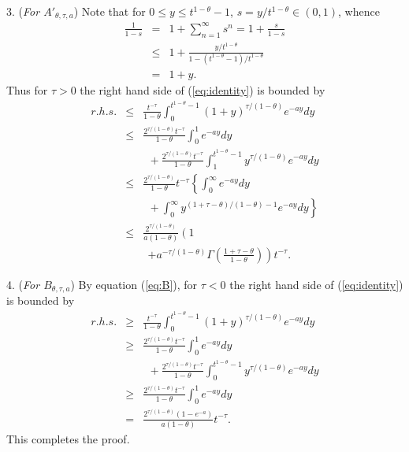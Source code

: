 \documentclass[twoside,twocolumn,journal]{IEEEtran}
\newenvironment{pf}[1][Proof]{\medskip\noindent\hspace{1em}{\itshape #1: }}{\hspace*{\fill}~\QED\par\endtrivlist\medskip}
\begin{document}
\begin{pf}
3. (\emph{For $A'_{\theta,\tau,a}$})
Note that for $0\leq y \leq t^{1-\theta}-1$, $s=y/t^{1-\theta}\in (0,1)$, whence
\begin{eqnarray} \label{eq:B}
\frac{1}{1-s} & = & 1 + \sum_{n=1}^\infty s^n
= 1 + \frac{s}{1 - s} \nonumber \\
& \leq & 1 + \frac{y/t^{1-\theta}}{1 - (t^{1-\theta}-1)/t^{1-\theta}} \nonumber \\
& = & 1 + y.
\end{eqnarray}
Thus for $\tau>0$ the right hand side of (\ref{eq:identity}) is bounded by
\begin{eqnarray*}
r.h.s.
& \leq &  \frac{t^{-\tau}}{1-\theta}\int_0^{t^{1-\theta}-1} (1+y)^{\tau/(1-\theta)} e^{-a y} d y  \\
& \leq & \frac{2^{\tau/(1-\theta)}t^{-\tau}}{1-\theta}\int_0^1  e^{-a y} d y  \\
& & \ \ + \frac{2^{\tau/(1-\theta)}t^{-\tau}}{1-\theta} \int_1^{t^{1-\theta}-1} y^{\tau/(1-\theta)} e^{-a y} d y \\
& \leq & \frac{2^{\tau/(1-\theta)}}{1-\theta} t^{-\tau}  \left\{\int_0^\infty  e^{-a y} d y \right. \\
& & \ \ + \left.\int_0^\infty y^{(1+\tau-\theta)/(1-\theta)-1} e^{-a y} d y \right\} \\
& \leq & \frac{2^{\tau/(1-\theta)}}{a(1-\theta)} \left(1 \right.\\
& & \ \ \left. +a^{-\tau/(1-\theta)} \Gamma \left( \frac{1+\tau-\theta}{1-\theta}\right)\right) t^{-\tau}.
\end{eqnarray*}

4. (\emph{For $B_{\theta,\tau,a}$})
By equation (\ref{eq:B}), for $\tau<0$ the right hand side of (\ref{eq:identity}) is bounded by
\begin{eqnarray*}
r.h.s.
& \geq &  \frac{t^{-\tau}}{1-\theta}\int_0^{t^{1-\theta}-1} (1+y)^{\tau/(1-\theta)} e^{-a y} d y  \\
& \geq & \frac{2^{\tau/(1-\theta)}t^{-\tau}}{1-\theta}\int_0^1  e^{-a y} d y  \\
& & \ \ + \frac{2^{\tau/(1-\theta)}t^{-\tau}}{1-\theta} \int_0^{t^{1-\theta}-1} y^{\tau/(1-\theta)} e^{-a y} d y \\
& \geq & \frac{2^{\tau/(1-\theta)}t^{-\tau}}{1-\theta}\int_0^1  e^{-a y} d y \\
& = & \frac{2^{\tau/(1-\theta)}(1-e^{-a})}{a(1-\theta)} t^{-\tau}.
\end{eqnarray*}
This completes the proof.
\end{pf}
\end{document}
